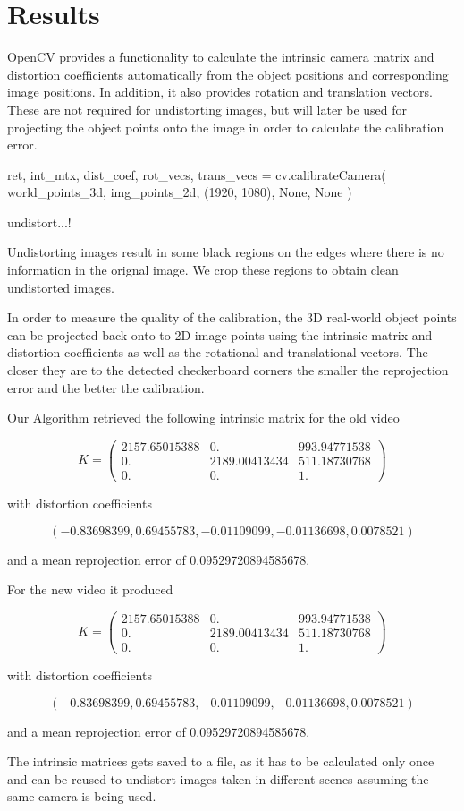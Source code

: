 \documentclass[bibliography=totoc]{scrartcl}
\begin{document}
\section{Results}
OpenCV provides a functionality to calculate the intrinsic camera matrix and distortion coefficients automatically from the object positions and corresponding image positions.
In addition, it also provides rotation and translation vectors.
These are not required for undistorting images, but will later be used for projecting the object points onto the image in order to calculate the calibration error.

\begin{python}
ret, int_mtx, dist_coef, rot_vecs, trans_vecs = cv.calibrateCamera(
    world_points_3d, img_points_2d, (1920, 1080), None, None
)
\end{python}

undistort...!

Undistorting images result in some black regions on the edges where there is no information in the orignal image.
We crop these regions to obtain clean undistorted images.

In order to measure the quality of the calibration, the 3D real-world object points can be projected back onto to 2D image points using the intrinsic matrix and distortion coefficients as well as the rotational and translational vectors.
The closer they are to the detected checkerboard corners the smaller the reprojection error and the better the calibration.

Our Algorithm retrieved the following intrinsic matrix for the old video

$$
K =
\begin{pmatrix}
    2157.65015388 & 0. & 993.94771538 \\
    0. & 2189.00413434 & 511.18730768 \\
    0. & 0. & 1.
\end{pmatrix}
$$

with distortion coefficients

$$(-0.83698399, 0.69455783, -0.01109099, -0.01136698, 0.0078521)$$

and a mean reprojection error of 0.09529720894585678.

For the new video it produced 

$$
K =
\begin{pmatrix}
    2157.65015388 & 0. & 993.94771538 \\
    0. & 2189.00413434 & 511.18730768 \\
    0. & 0. & 1.
\end{pmatrix}
$$

with distortion coefficients

$$(-0.83698399, 0.69455783, -0.01109099, -0.01136698, 0.0078521)$$

and a mean reprojection error of 0.09529720894585678.

The intrinsic matrices gets saved to a file, as it has to be calculated only once and can be reused to undistort images taken in different scenes assuming the same camera is being used.

\clearpage


\end{document}
